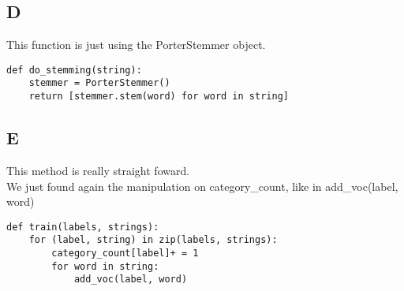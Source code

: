 \documentclass{article}
\begin{document}
        \subsection{D}
        This function is just using the PorterStemmer object.
            \begin{verbatim}
def do_stemming(string):
    stemmer = PorterStemmer()
    return [stemmer.stem(word) for word in string]
            \end{verbatim}
        \subsection{E}
            This method is really straight foward.\\
            We just found again the manipulation on category\_count, like in add\_voc(label, word)
            \begin{verbatim}
def train(labels, strings):
    for (label, string) in zip(labels, strings):
        category_count[label]+ = 1
        for word in string:
            add_voc(label, word)
            \end{verbatim}
\end{document}
